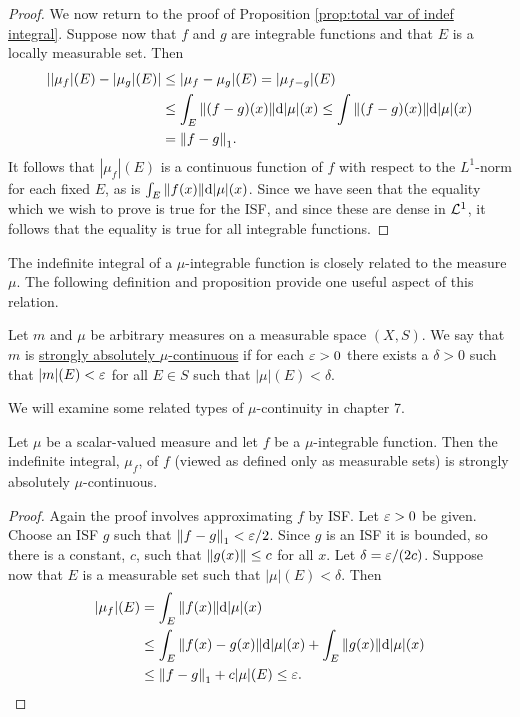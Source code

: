 \begin{proof}
We now return to the proof of Proposition \ref{prop:total var of indef integral}. Suppose now that $f$ and $g$ are integrable functions and that $E$ is a locally measurable set. Then
\begin{align*}
    ||\mu_f|(E)-|\mu_g|(E)|&\leq|\mu_f-\mu_g|(E)=|\mu_{f-g}|(E)\\
    &\leq\int_E\norm{(f-g)(x)}\dd|\mu|(x)\leq\int\norm{(f-g)(x)}\dd|\mu|(x)\\
    &=\norm{f-g}_1.
\end{align*}
It follows that $|\mu_f|(E)$ is a continuous function of $f$ with respect to the $L^1$-norm for each fixed $E$, as is $\int_E\norm{f(x)}\dd|\mu|(x)$. Since we have seen that the equality which we wish to prove is true for the ISF, and since these are dense in ${\cal L}^1$, it follows that the equality is true for all integrable functions.

\end{proof}

The indefinite integral of a $\mu$-integrable function is closely related to the measure $\mu$. The following definition and proposition provide one useful aspect of this relation.

\begin{definition}
Let $m$ and $\mu$ be arbitrary measures on a measurable space $(X,S)$. We say that $m$ is \underline{strongly absolutely $\mu$-continuous} if for each $\varepsilon>0$ there exists a $\delta>0$ such that $|m|(E)<\varepsilon$ for all $E\in S$ such that $|\mu|(E)<\delta$.
\end{definition}

We will examine some related types of $\mu$-continuity in chapter 7. %

\begin{proposition}
\label{prop:indef int mu strong abs cts}
Let $\mu$ be a scalar-valued measure and let $f$ be a $\mu$-integrable function. Then the indefinite integral, $\mu_f$, of $f$ (viewed as defined only as measurable sets) is strongly absolutely $\mu$-continuous.
\end{proposition}

\begin{proof}
Again the proof involves approximating $f$ by ISF. Let $\varepsilon>0$ be given. Choose an ISF $g$ such that $\norm{f-g}_1<\varepsilon/2$. Since $g$ is an ISF it is bounded, so there is a constant, $c$, such that $\norm{g(x)}\leq c$ for all $x$. Let $\delta=\varepsilon/(2c)$. Suppose now that $E$ is a measurable set such that $|\mu|(E)<\delta$. Then
\begin{align*}
    |\mu_f|(E)&=\int_E\norm{f(x)}\dd|\mu|(x)\\
    &\leq\int_E\norm{f(x)-g(x)}\dd|\mu|(x)+\int_E\norm{g(x)}\dd|\mu|(x)\\
    &\leq\norm{f-g}_1+c|\mu|(E)\leq\varepsilon.
\end{align*}
\end{proof}


